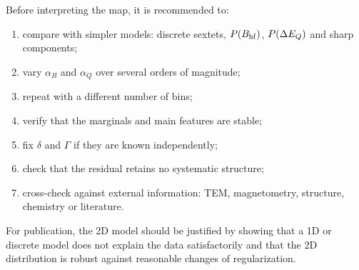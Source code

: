 Before interpreting the map, it is recommended to:
\begin{enumerate}
  \item compare with simpler models: discrete sextets, $P(B_{\mathrm{hf}})$,
  $P(\Delta E_Q)$ and sharp components;
  \item vary $\alpha_B$ and $\alpha_Q$ over several orders of magnitude;
  \item repeat with a different number of bins;
  \item verify that the marginals and main features are stable;
  \item fix $\delta$ and $\Gamma$ if they are known independently;
  \item check that the residual retains no systematic structure;
  \item cross-check against external information: TEM, magnetometry, structure,
  chemistry or literature.
\end{enumerate}
For publication, the 2D model should be justified by showing that a 1D or
discrete model does not explain the data satisfactorily and that the 2D
distribution is robust against reasonable changes of regularization.
